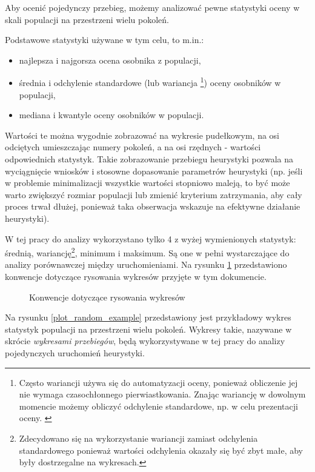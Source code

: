 \documentclass[twoside]{iisthesis}
\newcommand{\graph}[1]{}
\begin{document}
Aby ocenić pojedynczy przebieg, możemy analizować pewne statystyki oceny w skali populacji na przestrzeni wielu pokoleń.

Podstawowe statystyki używane w tym celu, to m.in.:
\begin{itemize}
	\item najlepsza i najgorsza ocena osobnika z populacji,
	\item średnia i odchylenie standardowe (lub wariancja \footnote{Często wariancji używa się do automatyzacji oceny, ponieważ obliczenie jej nie wymaga czasochłonnego pierwiastkowania. Znając wariancję w dowolnym momencie możemy obliczyć odchylenie standardowe, np. w celu prezentacji oceny.  \label{footer_variance}}) oceny osobników w populacji,
	\item mediana i kwantyle oceny osobników w populacji.
\end{itemize}

Wartości te można wygodnie zobrazować na wykresie pudełkowym, na osi odciętych umieszczając numery pokoleń, a na osi rzędnych - wartości odpowiednich statystyk. Takie zobrazowanie przebiegu heurystyki pozwala na wyciągnięcie wniosków i stosowne dopasowanie parametrów heurystyki (np. jeśli w problemie minimalizacji wszystkie wartości stopniowo maleją, to być może warto zwiększyć rozmiar populacji lub zmienić kryterium zatrzymania, aby cały proces trwał dłużej, ponieważ taka obserwacja wskazuje na efektywne działanie heurystyki).

W tej pracy do analizy wykorzystano tylko 4 z wyżej wymienionych statystyk: średnią, wariancję\footnote{Zdecydowano się na wykorzystanie wariancji zamiast odchylenia standardowego ponieważ wartości odchylenia okazały się być zbyt małe, aby były dostrzegalne na wykresach.}, minimum i maksimum. Są one w pełni wystarczające do analizy porównawczej między uruchomieniami. Na rysunku \ref{plot_conventions} przedstawiono konwencje dotyczące rysowania wykresów przyjęte w tym dokumencie.

\begin{figure}[H]
	\caption{Konwencje dotyczące rysowania wykresów \label{plot_conventions}}
	\centering
	\graph{example_whiskers.tex}
\end{figure}

Na rysunku \ref{plot_random_example} przedstawiony jest przykładowy wykres statystyk populacji na przestrzeni wielu pokoleń. Wykresy takie, nazywane w skrócie \emph{wykresami przebiegów}, będą wykorzystywane w tej pracy do analizy pojedynczych uruchomień heurystyki. 
\end{document}

